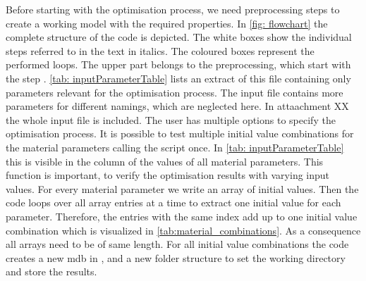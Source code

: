 Before starting with the optimisation process, we need preprocessing steps to create a working  model with the required properties. In \autoref{fig: flowchart} the complete structure of the code is depicted. The white boxes show the individual steps referred to in the text in italics. The coloured boxes represent the performed loops. The upper part belongs to the preprocessing, which start with the step . \autoref{tab: inputParameterTable} lists an extract of this file containing only parameters relevant for the optimisation process. The input file contains more parameters for different namings, which are neglected here. In attaachment XX the whole input file is included. The user has multiple options to specify the optimisation process. It is possible to test multiple initial value combinations for the material parameters calling the script once. In \autoref{tab: inputParameterTable} this is visible in the column  of the values of all material parameters. This function is important, to verify the optimisation results with varying input values. For every material parameter we write an array of initial values. Then the code loops over all array entries at a time to extract one initial value for each parameter. Therefore, the entries with the same index add up to one initial value combination which is visualized in \autoref{tab:material_combinations}. As a consequence all arrays need to be of same length. For all initial value combinations the code creates a new \acrfull{mdb} in , and a new folder structure to set the working directory and store the results.




